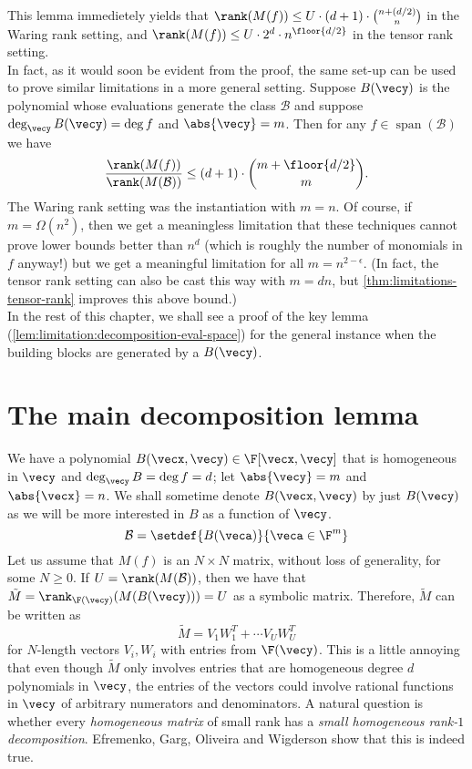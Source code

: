  This lemma immedietely yields that $\rank(M(f)) \leq U\cdot (d+1) \cdot \binom{n+(d/2)}{n}$ in the Waring rank setting, and $\rank(M(f)) \leq U\cdot 2^{d} \cdot n^{\floor{d/2}}$ in the tensor rank setting. \\

  In fact, as it would soon be evident from the proof, the same set-up can be used to prove similar limitations in a more general setting. Suppose $B(\vecy)$ is the polynomial whose evaluations generate the class $\mathcal{B}$ and suppose $\deg_\vecy B(\vecy) = \deg f$ and $\abs{\vecy} = m$. Then for any $f \in \operatorname{span}(\mathcal{B})$ we have
  \[
    \frac{\rank(M(f))}{\rank(M(\mathcal{B}))} \leq (d + 1) \cdot \binom{m + \floor{d/2}}{m}. 
  \]
  The Waring rank setting was the instantiation with $m = n$. Of course, if $m = \Omega(n^2)$, then we get a meaningless limitation that these techniques cannot prove lower bounds better than $n^d$ (which is roughly the number of monomials in $f$ anyway!) but we get a meaningful limitation for all $m = n^{2 - \epsilon}$. (In fact, the tensor rank setting can also be cast this way with $m = dn$, but \autoref{thm:limitations-tensor-rank} improves this above bound.)\\

  In the rest of this chapter, we shall see a proof of the key lemma (\autoref{lem:limitation:decomposition-eval-space}) for the general instance when the building blocks are generated by a $B(\vecy)$.

\section{The main decomposition lemma}

We have a polynomial $B(\vecx, \vecy) \in \F[\vecx, \vecy]$ that is homogeneous in $\vecy$ and $\deg_\vecy B = \deg f = d$; let $\abs{\vecy} = m$ and $\abs{\vecx} = n$. We shall sometime denote $B(\vecx, \vecy)$ by just $B(\vecy)$ as we will be more interested in $B$ as a function of $\vecy$.
\[
  \mathcal{B} = \setdef{B(\veca)}{\veca \in \F^m}
\]
Let us assume that $M(f)$ is an $N\times N$ matrix, without loss of generality, for some $N \geq 0$. 
If $U = \rank(M(\mathcal{B}))$, then we have that $\tilde{M} = \rank_{\F(\vecy)}(M(B(\vecy))) = U$ as a symbolic matrix. Therefore, $\tilde{M}$ can be written as
\[
  \tilde{M} = V_1 W_1^T + \cdots V_U W_U^T
\]
for $N$-length vectors $V_i, W_i$ with entries from $\F(\vecy)$. This is a little annoying that even though $\tilde{M}$ only involves entries that are homogeneous degree $d$ polynomials in $\vecy$, the entries of the vectors could involve rational functions in $\vecy$ of arbitrary numerators and denominators. A natural question is whether every \emph{homogeneous matrix} of small rank has a \emph{small homogeneous rank-$1$ decomposition}. Efremenko, Garg, Oliveira and Wigderson show that this is indeed true.

